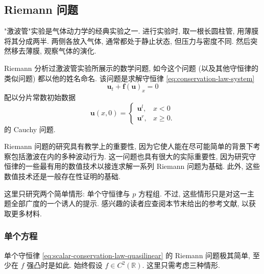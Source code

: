 \subsection{Riemann 问题}\label{sec:riemann-problems}

"激波管"实验是气体动力学的经典实验之一. 进行实验时, 取一根长圆柱管, 用薄膜将其分成两半. 两侧各放入气体, 通常都处于静止状态, 但压力与密度不同. 然后突然移去薄膜, 观察气体的演化.

Riemann 分析过激波管实验所展示的数学问题, 如今这个问题 (以及其他守恒律的类似问题) 都以他的姓名命名. 该问题是求解守恒律 \eqref{eq:conservation-law-system}
\[
\bm{u}_t+\bm{f}(\bm{u})_x=0
\]
配以分片常数初始数据
\begin{equation}\label{eq:riemann-piecewise-constant-data}
\bm{u}(x,0)=\begin{cases}\bm{u}^l,&x<0\\\bm{u}^r,&x\geq0.\end{cases}
\end{equation}
的 Cauchy 问题.

Riemann 问题的研究具有教学上的重要性, 因为它使人能在尽可能简单的背景下考察包括激波在内的多种波动行为. 这一问题也具有很大的实际重要性, 因为研究守恒律的一些最有用的数值技术以接连求解一系列 Riemann 问题为基础. 此外, 这些数值技术还是一般存在性证明的基础.

这里只研究两个简单情形: 单个守恒律与 $p$ 方程组. 不过, 这些情形只是对这一主题全部广度的一个诱人的提示. 感兴趣的读者应查阅本节末给出的参考文献, 以获取更多材料.

\subsubsection{单个方程}\label{subsec:scalar-riemann-problems}

单个守恒律 \eqref{eq:scalar-conservation-law-quasilinear} 的 Riemann 问题极其简单, 至少在 $f$ 强凸时是如此. 始终假设 $f\in C^2(\mathbb{R})$. 这里只需考虑三种情形.

